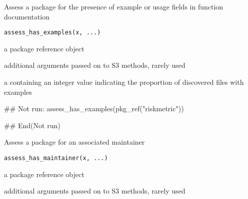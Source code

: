 \documentclass[a4paper]{book}
\begin{document}
%
\begin{Description}
Assess a package for the presence of example or usage fields in function documentation
\end{Description}
%
\begin{Usage}
\begin{verbatim}
assess_has_examples(x, ...)
\end{verbatim}
\end{Usage}
%
\begin{Arguments}
\begin{ldescription}
\item[\code{x}] a  package reference object

\item[\code{...}] additional arguments passed on to S3 methods, rarely used
\end{ldescription}
\end{Arguments}
%
\begin{Value}
a  containing an integer value indicating the proportion of discovered files with examples
\end{Value}
%
\begin{SeeAlso}
\end{SeeAlso}
%
\begin{Examples}
\begin{ExampleCode}
## Not run: 
assess_has_examples(pkg_ref("riskmetric"))

## End(Not run)
\end{ExampleCode}
\end{Examples}
%
\begin{Description}
Assess a package for an associated maintainer
\end{Description}
%
\begin{Usage}
\begin{verbatim}
assess_has_maintainer(x, ...)
\end{verbatim}
\end{Usage}
%
\begin{Arguments}
\begin{ldescription}
\item[\code{x}] a  package reference object

\item[\code{...}] additional arguments passed on to S3 methods, rarely used
\end{ldescription}
\end{Arguments}
\end{document}
